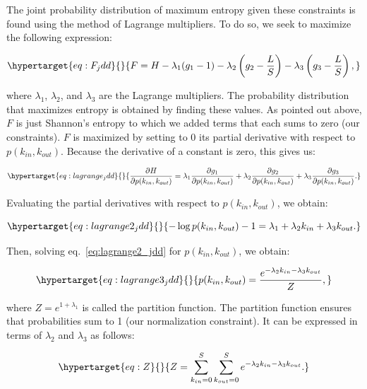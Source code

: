 \documentclass[11pt]{article}
\begin{document}
The joint probability distribution of maximum entropy given these
constraints is found using the method of Lagrange multipliers. To do so,
we seek to maximize the following expression:

\begin{equation}\protect\hypertarget{eq:F_jdd}{}{F = H - \lambda_1(g_1-1)-\lambda_2\left( g_2-\frac{L}{S}\right) - \lambda_3 \left( g_3-\frac{L}{S}\right),}\label{eq:F_jdd}\end{equation}

where \(\lambda_1\), \(\lambda_2\), and \(\lambda_3\) are the Lagrange
multipliers. The probability distribution that maximizes entropy is
obtained by finding these values. As pointed out above, \(F\) is just
Shannon's entropy to which we added terms that each sums to zero (our
constraints). \(F\) is maximized by setting to 0 its partial derivative
with respect to \(p(k_{in},k_{out})\). Because the derivative of a
constant is zero, this gives us:

\begin{equation}\protect\hypertarget{eq:lagrange_jdd}{}{\frac{\partial H}{\partial p(k_{in},k_{out})} = \lambda_1 \frac{\partial g_1}{\partial p(k_{in},k_{out})} + \lambda_2 \frac{\partial g_2}{\partial p(k_{in},k_{out})}+ \lambda_3 \frac{\partial g_3}{\partial p(k_{in},k_{out})}.}\label{eq:lagrange_jdd}\end{equation}

Evaluating the partial derivatives with respect to
\(p(k_{in},k_{out})\), we obtain:

\begin{equation}\protect\hypertarget{eq:lagrange2_jdd}{}{-\log p(k_{in},k_{out}) - 1 = \lambda_1 + \lambda_2 k_{in} + \lambda_3 k_{out}.}\label{eq:lagrange2_jdd}\end{equation}

Then, solving eq.~\ref{eq:lagrange2_jdd} for \(p(k_{in},k_{out})\), we
obtain:

\begin{equation}\protect\hypertarget{eq:lagrange3_jdd}{}{p(k_{in},k_{out}) = \frac{e^{-\lambda_2k_{in}-\lambda_3k_{out}}}{Z},}\label{eq:lagrange3_jdd}\end{equation}

where \(Z = e^{1+\lambda_1}\) is called the partition function. The
partition function ensures that probabilities sum to 1 (our
normalization constraint). It can be expressed in terms of \(\lambda_2\)
and \(\lambda_3\) as follows:

\begin{equation}\protect\hypertarget{eq:Z}{}{Z = \sum_{k_{in}=0}^S\sum_{k_{out}=0}^S e^{-\lambda_2k_{in}-\lambda_3k_{out}}.}\label{eq:Z}\end{equation}
\end{document}
